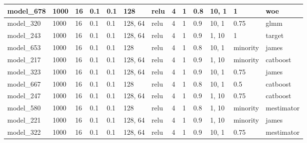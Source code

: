 \begin{tabular}{|l|l|l|l|l|l|l|l|l|l|l|l|l|}
model\_678     & 1000           & 16           & 0.1          & 0.1          & 128         & relu         & 4           & 1            & 0.8               & 10, 1            & 1                           & woe               \\ \hline
model\_320     & 1000           & 16           & 0.1          & 0.1          & 128, 64     & relu         & 4           & 1            & 0.9               & 10, 1            & 0.75                        & glmm              \\ \hline
model\_243     & 1000           & 16           & 0.1          & 0.1          & 128, 64     & relu         & 4           & 1            & 0.9               & 1, 10            & 1                           & target            \\ \hline
model\_653     & 1000           & 16           & 0.1          & 0.1          & 128         & relu         & 4           & 1            & 0.8               & 10, 1            & minority                    & james             \\ \hline
model\_217     & 1000           & 16           & 0.1          & 0.1          & 128, 64     & relu         & 4           & 1            & 0.9               & 1, 10            & minority                    & catboost          \\ \hline
model\_323     & 1000           & 16           & 0.1          & 0.1          & 128, 64     & relu         & 4           & 1            & 0.9               & 10, 1            & 0.75                        & james             \\ \hline
model\_667     & 1000           & 16           & 0.1          & 0.1          & 128         & relu         & 4           & 1            & 0.8               & 10, 1            & 0.5                         & catboost          \\ \hline
model\_247     & 1000           & 16           & 0.1          & 0.1          & 128, 64     & relu         & 4           & 1            & 0.9               & 1, 10            & 0.75                        & catboost          \\ \hline
model\_580     & 1000           & 16           & 0.1          & 0.1          & 128         & relu         & 4           & 1            & 0.8               & 1, 10            & minority                    & mestimator        \\ \hline
model\_221     & 1000           & 16           & 0.1          & 0.1          & 128, 64     & relu         & 4           & 1            & 0.9               & 1, 10            & minority                    & james             \\ \hline
model\_322     & 1000           & 16           & 0.1          & 0.1          & 128, 64     & relu         & 4           & 1            & 0.9               & 10, 1            & 0.75                        & mestimator        \\ \hline
\end{tabular}